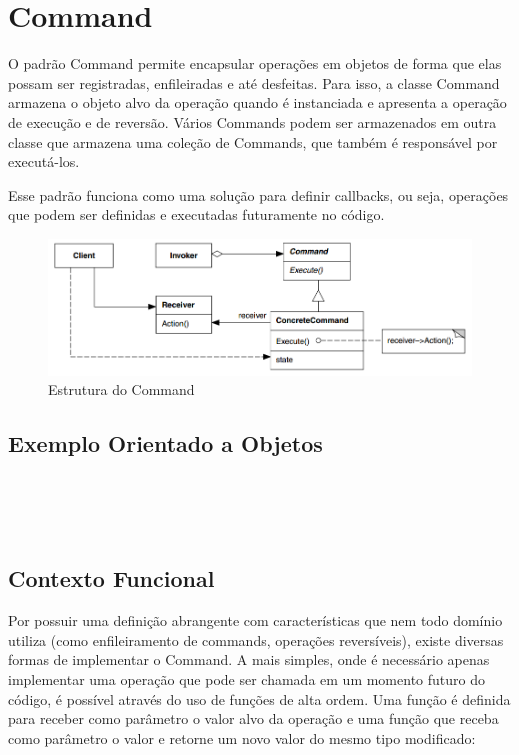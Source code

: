 \section{Command}

O padrão Command permite encapsular operações em objetos 
de forma que elas possam ser registradas, enfileiradas 
e até desfeitas. Para isso, a classe Command armazena o 
objeto alvo da operação quando é instanciada e apresenta 
a operação de execução e de reversão. Vários Commands 
podem ser armazenados em outra classe que armazena uma 
coleção de Commands, que também é responsável por 
executá-los.

Esse padrão funciona como uma solução para definir 
callbacks, ou seja, operações que podem ser definidas 
e executadas futuramente no código.

\begin{figure}[htb]
	\caption{\label{command_struct}Estrutura do Command}
	\begin{center}
	    \includegraphics[scale=0.4]{5_padroes-contexto-funcional/5.3_comportamentais/5.3.02_command/diagram.png}
	\end{center}
\end{figure}

\subsection*{Exemplo Orientado a Objetos}

\begin{lstlisting}[caption={Command Orientação a Objetos},label=oocommand]


    
\end{lstlisting}

\subsection*{Contexto Funcional}

Por possuir uma definição abrangente com características 
que nem todo domínio utiliza (como enfileiramento de 
commands, operações reversíveis), existe diversas formas 
de implementar o Command. A mais simples, onde é necessário 
apenas implementar uma operação que pode ser chamada em 
um momento futuro do código, é possível através do uso 
de funções de alta ordem. Uma função é definida para 
receber como parâmetro o valor alvo da operação e uma 
função que receba como parâmetro o valor e retorne um 
novo valor do mesmo tipo modificado:

